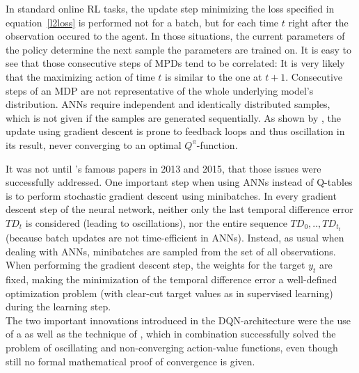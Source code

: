 In standard online RL tasks, the update step minimizing the loss specified in equation~\ref{l2loss} is performed not for a batch, but for each time $t$ right after the observation occured to the agent. 
In those situations, the current parameters of the policy determine the next sample the parameters are trained on. It is easy to see that those consecutive steps of MPDs tend to be correlated: It is very likely that the maximizing action of time $t$ is similar to the one at $t+1$. Consecutive steps of an MDP are not representative of the whole underlying model's distribution. ANNs require independent and identically distributed samples, which is not given if the samples are generated sequentially. As shown by \cite{john_n._tsitsiklis_analysis_1997}, the update using gradient descent is prone to feedback loops and thus oscillation in its result, never converging to an optimal $Q^\pi$-function. 

It was not until 's famous papers in 2013\cite{mnih_playing_2013} and 2015\cite{mnih_human-level_2015}, that those issues were successfully addressed. One important step when using ANNs instead of Q-tables is to perform stochastic gradient descent using minibatches. In every gradient descent step of the neural network, neither only the last temporal difference error $TD_t$ is considered (leading to oscillations), nor the entire sequence $TD_0, .., TD_{t_t}$ (because batch updates are not time-efficient in ANNs). Instead, as usual when dealing with ANNs, minibatches are sampled from the set of all observations. When performing the gradient descent step, the weights for the target $y_t$ are fixed, making the minimization of the temporal difference error a well-defined optimization problem (with clear-cut target values as in supervised learning) during the learning step.\\


\noindent The two important innovations introduced in the DQN-architecture were the use of a  as well as the technique of , which in combination successfully solved the problem of oscillating and non-converging action-value functions, even though still no formal mathematical proof of convergence is given. %

